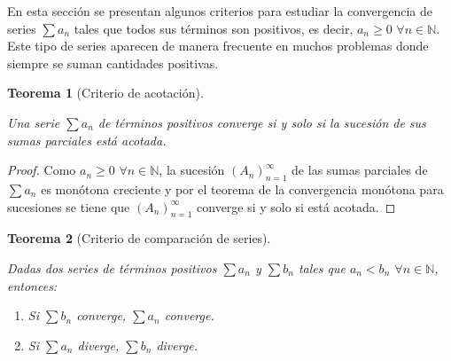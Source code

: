 \documentclass[
  a4paper,
]{scrreport}
\providecommand{\tightlist}{%
  \setlength{\itemsep}{0pt}\setlength{\parskip}{0pt}}\usepackage{longtable,booktabs,array}
\theoremstyle{plain}
\theoremstyle{plain}
\theoremstyle{definition}
\theoremstyle{definition}
\theoremstyle{plain}
\newtheorem{theorem}{Teorema}[chapter]
\theoremstyle{remark}
\begin{document}
En esta sección se presentan algunos criterios para estudiar la
convergencia de series \(\sum a_n\) tales que todos sus términos son
positivos, es decir, \(a_n\geq 0\) \(\forall n\in\mathbb{N}\). Este tipo
de series aparecen de manera frecuente en muchos problemas donde siempre
se suman cantidades positivas.

\leavevmode{}%
\begin{theorem}[Criterio de acotación]\label{thm-criterio-acotacion}

Una serie \(\sum a_n\) de términos positivos converge si y solo si la
sucesión de sus sumas parciales está acotada.

\end{theorem}

\begin{tcolorbox}[enhanced jigsaw, breakable, bottomrule=.15mm, coltitle=black, bottomtitle=1mm, opacityback=0, title=\textcolor{quarto-callout-note-color}{\faInfo}\hspace{0.5em}{Demostración}, left=2mm, toptitle=1mm, toprule=.15mm, opacitybacktitle=0.6, colframe=quarto-callout-note-color-frame, arc=.35mm, colback=white, rightrule=.15mm, titlerule=0mm, leftrule=.75mm, colbacktitle=quarto-callout-note-color!10!white]

\begin{proof}

Como \(a_n\geq 0\) \(\forall n\in\mathbb{N}\), la sucesión
\((A_n)_{n=1}^\infty\) de las sumas parciales de \(\sum a_n\) es
monótona creciente y por el teorema de la convergencia monótona para
sucesiones se tiene que \((A_n)_{n=1}^\infty\) converge si y solo si
está acotada.

\end{proof}

\end{tcolorbox}

\leavevmode{}%
\begin{theorem}[Criterio de comparación de
series]\label{thm-criterio-comparacion}

Dadas dos series de términos positivos \(\sum a_n\) y \(\sum b_n\) tales
que \(a_n<b_n\) \(\forall n\in\mathbb{N}\), entonces:

\begin{enumerate}
\def\labelenumi{\alph{enumi}.}
\tightlist
\item
  Si \(\sum b_n\) converge, \(\sum a_n\) converge.
\item
  Si \(\sum a_n\) diverge, \(\sum b_n\) diverge.
\end{enumerate}

\end{theorem}
\end{document}

